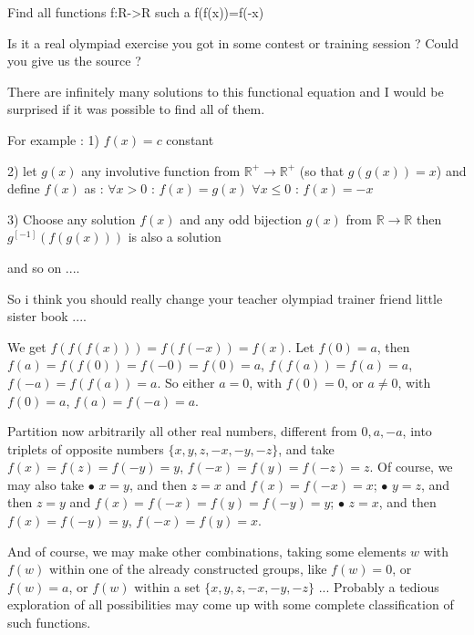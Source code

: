 \begin{solution}
	\begin{tcolorbox}Find all functions f:R->R such a f(f(x))=f(-x)\end{tcolorbox}
Is it a real olympiad exercise you got in some contest or training session ? Could you give us the source ?

There are infinitely many solutions to this functional equation and I would be surprised if it was possible to find all of them.

For example :
1) $f(x)=c$ constant

2) let $g(x)$ any involutive function from $\mathbb R^+\to\mathbb R^+$ (so that $g(g(x))=x$) and define $f(x)$ as :
$\forall x>0$ : $f(x)=g(x)$
$\forall x\le 0$ : $f(x)=-x$

3) Choose any solution $f(x)$ and any odd bijection $g(x)$ from $\mathbb R\to\mathbb R$
then $g^{[-1]}(f(g(x)))$ is also a solution

and so on ....

So i think you should really change your teacher \/ olympiad trainer \/ friend \/ little sister \/ book ....
\end{solution}



\begin{solution}
	We get $f(f(f(x))) = f(f(-x)) = f(x)$. Let $f(0) = a$, then $f(a) = f(f(0)) = f(-0) = f(0) = a$, $f(f(a)) = f(a) = a$, $f(-a) = f(f(a)) = a$. So either $a=0$, with $f(0)=0$, or $a\neq 0$, with $f(0)=a$, $f(a) = f(-a) = a$.

Partition now arbitrarily all other real numbers, different from $0,a,-a$, into triplets of opposite numbers $\{x,y,z,-x,-y,-z\}$, and take $f(x) = f(z) = f(-y) = y$, $f(-x) = f(y) = f(-z) =z$. Of course, we may also take 
$\bullet$ $x=y$, and then $z=x$ and $f(x)=f(-x)=x$;
$\bullet$ $y=z$, and then $z=y$ and $f(x)=f(-x)=f(y) = f(-y) = y$;
$\bullet$ $z=x$, and then $f(x)=f(-y)=y$, $f(-x) = f(y) = x$.

And of course, we may make other combinations, taking some elements $w$ with $f(w)$ within one of the already constructed groups, like $f(w) = 0$, or $f(w)=a$, or $f(w)$ within a set $\{x,y,z,-x,-y,-z\}$ ... Probably a tedious exploration of all possibilities may come up with some complete classification of such functions.
\end{solution}



